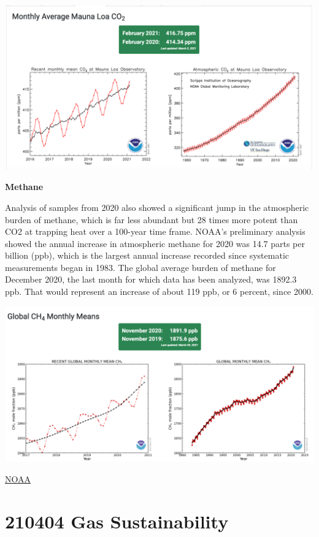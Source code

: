 \documentclass[
]{book}
\begin{document}
\includegraphics{fig/monthly-avg-co2-mlo.png}

\textbf{Methane}

Analysis of samples from 2020 also showed a significant jump in the atmospheric burden of methane, which is far less abundant but 28 times more potent than CO2 at trapping heat over a 100-year time frame. NOAA's preliminary analysis showed the annual increase in atmospheric methane for 2020 was 14.7 parts per billion (ppb), which is the largest annual increase recorded since systematic measurements began in 1983. The global average burden of methane for December 2020, the last month for which data has been analyzed, was 1892.3 ppb. That would represent an increase of about 119 ppb, or 6 percent, since 2000.

\includegraphics{fig/2020-global-ch4.png}

\href{https://research.noaa.gov/article/ArtMID/587/ArticleID/2742/Despite-pandemic-shutdowns-carbon-dioxide-and-methane-surged-in-2020}{NOAA}

\hypertarget{gas-sustainability}{%
\section{210404 Gas Sustainability}\label{gas-sustainability}}
\end{document}
